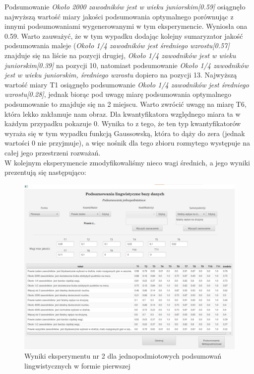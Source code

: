 \documentclass{classrep}
\begin{document}
Podsumowanie \textit{Około 2000 zawodników jest w wieku juniorskim[0.59]} osiągnęło najwyższą wartość miary jakości podsumowania optymalnego porównując z innymi podsumowaniami wygenerowanymi w tym eksperymencie. Wyniosła ona 0.59. Warto zauważyć, że w tym wypadku dodając kolejny sumaryzator jakość podsumowania maleje (\textit{Około 1/4 zawodników jest średniego wzrostu[0.57]} znajduje się na liście na pozycji drugiej, \textit{Około 1/4 zawodników jest w wieku juniorskim[0.39]} na pozycji 10, natomiast podsumowanie \textit{Około 1/4 zawodników jest w wieku juniorskim, średniego wzrostu} dopiero na pozycji 13. Najwyższą wartość miary T1 osiągnęło podsumowanie \textit{Około 1/4 zawodników jest średniego wzrostu[0.28]}, jednak biorąc pod uwagę miarę podsumowania optymalnego podsumowanie to znajduje się na 2 miejscu. Warto zwrócić uwagę na miarę T6, która lekko zakłamuje nam obraz. Dla kwantyfikatora względnego miara ta w każdym przypadku pokazuje 0. Wynika to z tego, że ten typ kwantyfikatorów wyraża się w tym wypadku funkcją Gaussowską, która to dąży do zera (jednak wartości 0 nie przyjmuje), a więc nośnik dla tego zbioru rozmytego występuje na całej jego przestrzeni rozważań.
\\
\indent W kolejnym eksperymencie zmodyfikowaliśmy nieco wagi średnich, a jego wyniki prezentują się następująco: 
\begin{figure}[H]
    \centering
    \includegraphics[width = 14cm]{eksperyment2.png}
    \caption{Wyniki eksperymentu nr 2 dla jednopodmiotowych podsumowań lingwistycznych w formie pierwszej}
    \label{rysunek:forma_pierwsza_eksperyment_2}
\end{figure}
\end{document}
